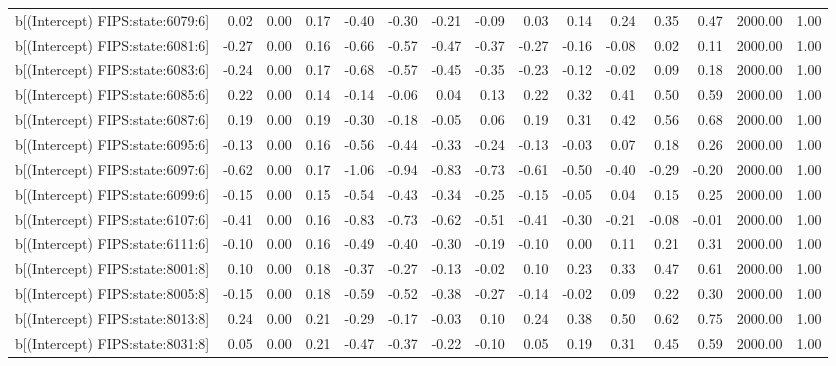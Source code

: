 \begin{table}[ht]
\begin{tabular}{rrrrrrrrrrrrrrr}
  b[(Intercept) FIPS:state:6079:6] & 0.02 & 0.00 & 0.17 & -0.40 & -0.30 & -0.21 & -0.09 & 0.03 & 0.14 & 0.24 & 0.35 & 0.47 & 2000.00 & 1.00 \\ 
  b[(Intercept) FIPS:state:6081:6] & -0.27 & 0.00 & 0.16 & -0.66 & -0.57 & -0.47 & -0.37 & -0.27 & -0.16 & -0.08 & 0.02 & 0.11 & 2000.00 & 1.00 \\ 
  b[(Intercept) FIPS:state:6083:6] & -0.24 & 0.00 & 0.17 & -0.68 & -0.57 & -0.45 & -0.35 & -0.23 & -0.12 & -0.02 & 0.09 & 0.18 & 2000.00 & 1.00 \\ 
  b[(Intercept) FIPS:state:6085:6] & 0.22 & 0.00 & 0.14 & -0.14 & -0.06 & 0.04 & 0.13 & 0.22 & 0.32 & 0.41 & 0.50 & 0.59 & 2000.00 & 1.00 \\ 
  b[(Intercept) FIPS:state:6087:6] & 0.19 & 0.00 & 0.19 & -0.30 & -0.18 & -0.05 & 0.06 & 0.19 & 0.31 & 0.42 & 0.56 & 0.68 & 2000.00 & 1.00 \\ 
  b[(Intercept) FIPS:state:6095:6] & -0.13 & 0.00 & 0.16 & -0.56 & -0.44 & -0.33 & -0.24 & -0.13 & -0.03 & 0.07 & 0.18 & 0.26 & 2000.00 & 1.00 \\ 
  b[(Intercept) FIPS:state:6097:6] & -0.62 & 0.00 & 0.17 & -1.06 & -0.94 & -0.83 & -0.73 & -0.61 & -0.50 & -0.40 & -0.29 & -0.20 & 2000.00 & 1.00 \\ 
  b[(Intercept) FIPS:state:6099:6] & -0.15 & 0.00 & 0.15 & -0.54 & -0.43 & -0.34 & -0.25 & -0.15 & -0.05 & 0.04 & 0.15 & 0.25 & 2000.00 & 1.00 \\ 
  b[(Intercept) FIPS:state:6107:6] & -0.41 & 0.00 & 0.16 & -0.83 & -0.73 & -0.62 & -0.51 & -0.41 & -0.30 & -0.21 & -0.08 & -0.01 & 2000.00 & 1.00 \\ 
  b[(Intercept) FIPS:state:6111:6] & -0.10 & 0.00 & 0.16 & -0.49 & -0.40 & -0.30 & -0.19 & -0.10 & 0.00 & 0.11 & 0.21 & 0.31 & 2000.00 & 1.00 \\ 
  b[(Intercept) FIPS:state:8001:8] & 0.10 & 0.00 & 0.18 & -0.37 & -0.27 & -0.13 & -0.02 & 0.10 & 0.23 & 0.33 & 0.47 & 0.61 & 2000.00 & 1.00 \\ 
  b[(Intercept) FIPS:state:8005:8] & -0.15 & 0.00 & 0.18 & -0.59 & -0.52 & -0.38 & -0.27 & -0.14 & -0.02 & 0.09 & 0.22 & 0.30 & 2000.00 & 1.00 \\ 
  b[(Intercept) FIPS:state:8013:8] & 0.24 & 0.00 & 0.21 & -0.29 & -0.17 & -0.03 & 0.10 & 0.24 & 0.38 & 0.50 & 0.62 & 0.75 & 2000.00 & 1.00 \\ 
  b[(Intercept) FIPS:state:8031:8] & 0.05 & 0.00 & 0.21 & -0.47 & -0.37 & -0.22 & -0.10 & 0.05 & 0.19 & 0.31 & 0.45 & 0.59 & 2000.00 & 1.00 \\ 

\end{tabular}
\end{table}
